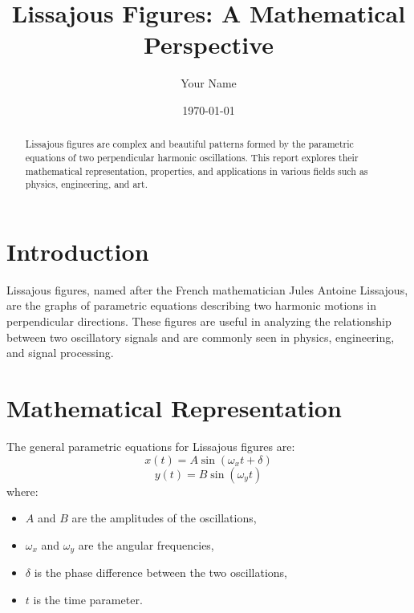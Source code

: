 \documentclass{article}
\title{Lissajous Figures: A Mathematical Perspective}
\author{Your Name}
\date{\today}
\begin{document}
\maketitle

\begin{abstract}
Lissajous figures are complex and beautiful patterns formed by the parametric equations of two perpendicular harmonic oscillations. This report explores their mathematical representation, properties, and applications in various fields such as physics, engineering, and art.
\end{abstract}

\section{Introduction}
Lissajous figures, named after the French mathematician Jules Antoine Lissajous, are the graphs of parametric equations describing two harmonic motions in perpendicular directions. These figures are useful in analyzing the relationship between two oscillatory signals and are commonly seen in physics, engineering, and signal processing.

\section{Mathematical Representation}
The general parametric equations for Lissajous figures are:
\begin{equation}
x(t) = A \sin(\omega_x t + \delta)
\end{equation}
\begin{equation}
y(t) = B \sin(\omega_y t)
\end{equation}
where:
\begin{itemize}
\item $A$ and $B$ are the amplitudes of the oscillations,
\item $\omega_x$ and $\omega_y$ are the angular frequencies,
\item $\delta$ is the phase difference between the two oscillations,
\item $t$ is the time parameter.
\end{itemize}
\end{document}

